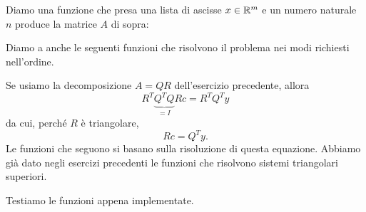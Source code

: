 Diamo una funzione che presa una lista di ascisse \(x \in \mathbb R^m\) e un numero naturale \(n\) produce la matrice \(A\) di sopra:



Diamo a anche le seguenti funzioni che risolvono il problema nei modi richiesti nell'ordine.



Se usiamo la decomposizione \(A = Q R\) dell'esercizio precedente, allora
\[R^T \underbrace{Q^T Q}_{= I} R c = R^T Q^T y\]
da cui, perché \(R\) è triangolare,
\[R c = Q^T y .\]
Le funzioni che seguono si basano sulla risoluzione di questa equazione. Abbiamo già dato negli esercizi precedenti le funzioni che risolvono sistemi triangolari superiori.





Testiamo le funzioni appena implementate. %

